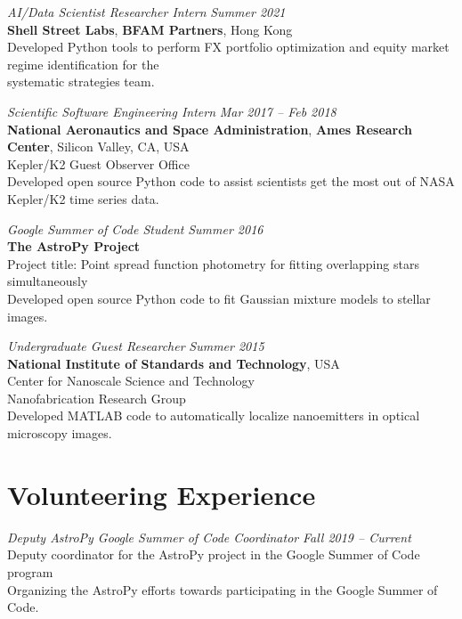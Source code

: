 \documentclass[10pt]{article}
\begin{document}
\begin{titlepage}
\emph{AI/Data Scientist Researcher Intern} \hfill \textit{Summer 2021}
  \\\textbf{Shell Street Labs}, \textbf{BFAM Partners}, Hong Kong
  \\ {\small Developed \textsf{Python} tools to perform FX portfolio optimization and equity market regime identification for the}
  \\ {\small  systematic strategies team.}
\vspace{.5cm}


\emph{Scientific Software Engineering Intern} \hfill \textit{Mar 2017 -- Feb 2018}
\\\textbf{National Aeronautics and Space Administration}, \textbf{Ames Research Center}, Silicon Valley, CA, USA
\\Kepler/K2 Guest Observer Office
\\ {\small Developed open source \textsf{Python} code
    to assist scientists get the most out of NASA Kepler/K2 time series data.}
\vspace{.5cm}

\emph{Google Summer of Code Student} \hfill \textit{Summer 2016}
\\\textbf{The AstroPy Project}
\\ Project title: Point spread function photometry for fitting overlapping stars simultaneously
\\ {\small Developed open source \textsf{Python} code
    to fit Gaussian mixture models to stellar images.}
\vspace{.5cm}

\emph{Undergraduate Guest Researcher} \hfill \textit{Summer 2015}
\\\textbf{National Institute of Standards and Technology}, USA
\\Center for Nanoscale Science and Technology
\\Nanofabrication Research Group
\\ {\small Developed \textsf{MATLAB} code to automatically localize nanoemitters in optical microscopy images.}


\section*{Volunteering Experience}
\emph{Deputy AstroPy Google Summer of Code Coordinator} \hfill \textit{Fall 2019 -- Current}
\\Deputy coordinator for the AstroPy project in the Google Summer of Code program
\\ {\small Organizing the AstroPy efforts towards participating in the Google Summer of Code.}
\vspace{.5cm}


\end{titlepage}
\end{document}
